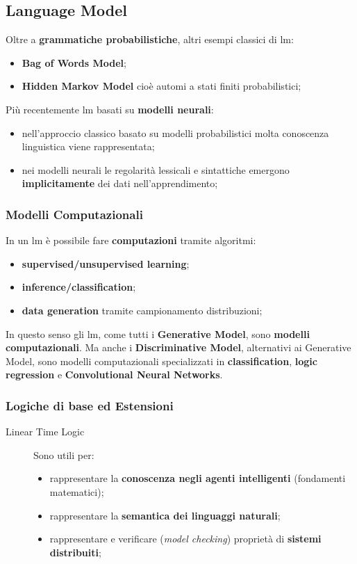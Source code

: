 \subsection{Language Model}\label{sub:i_language_model} %
Oltre a \textbf{grammatiche probabilistiche}, altri esempi classici di \ac{lm}:
\begin{itemize}
    \item \textbf{Bag of Words Model};
    \item \textbf{Hidden Markov Model} cioè automi a stati finiti probabilistici; 
\end{itemize}
Più recentemente \ac{lm} basati su \textbf{modelli neurali}:
\begin{itemize}
    \item nell'approccio classico basato su modelli probabilistici molta conoscenza linguistica viene  rappresentata;
    \item nei modelli neurali le regolarità lessicali e sintattiche emergono \textbf{implicitamente} dei dati nell'apprendimento;
\end{itemize}
%
\subsubsection{Modelli Computazionali}\label{sub:i_modelli_computazionali} %
In un \ac{lm} è possibile fare \textbf{computazioni} tramite algoritmi:
\begin{itemize}
    \item \textbf{supervised/unsupervised learning};
    \item \textbf{inference/classification};
    \item \textbf{data generation} tramite campionamento distribuzioni;
\end{itemize}
In questo senso gli \ac{lm}, come tutti i \textbf{Generative Model}, sono \textbf{modelli computazionali}.
\emptyln{}
Ma anche i \textbf{Discriminative Model}, alternativi ai Generative Model, sono modelli computazionali specializzati in \textbf{classification}, \textbf{logic regression} e \textbf{Convolutional Neural Networks}.
%
\subsubsection{Logiche di base ed Estensioni}\label{sub:i_logiche_di_base_ed_estensioni} %
\begin{description}
    \item[Linear Time Logic] Sono utili per:
        \begin{itemize}
            \item rappresentare la \textbf{conoscenza negli agenti intelligenti} (fondamenti matematici);
            \item rappresentare la \textbf{semantica dei linguaggi naturali};
            \item rappresentare e verificare (\textit{model checking}) proprietà di \textbf{sistemi distribuiti};
        \end{itemize}
\end{description}
%
